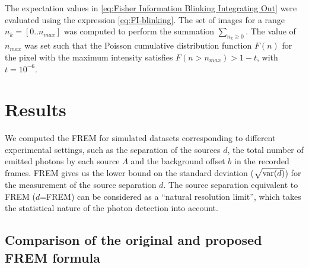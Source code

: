 The expectation values in \autoref{eq:Fisher Information Blinking Integrating Out} were evaluated using the expression \autoref{eq:FI-blinking}. The set of images for a range $n_k=[0..n_{max}]$ was computed to perform the summation $\sum_{n_k\geq0}$. The value of $n_{max}$ was set such that the Poisson cumulative distribution function $F(n)$ for the pixel with the maximum intensity satisfies $F(n>n_{max})>1-t$, with $t=10^{-6}$.


\clearpage
\section{Results\label{sec:FREM results}}

We computed the FREM for simulated datasets corresponding to different experimental settings, such as the separation of the sources $d$, the total number of emitted photons by each source $\Lambda$ and the background offset $b$ in the recorded frames. FREM gives us the lower bound on the standard deviation ($\sqrt{\mathrm{var}(d)}$) for the measurement of the source separation $d$. The source separation equivalent to FREM ($d$=FREM) can be considered as a ``natural resolution limit'', which takes the statistical nature of the photon detection into account.

\subsection{Comparison of the original and proposed FREM formula\label{sec:comparison orig and new FREM}}

